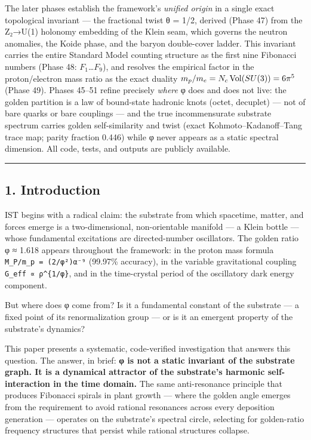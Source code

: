 \documentclass[
]{article}
\begin{document}
The later phases establish the framework's \emph{unified origin} in a
single exact topological invariant --- the fractional twist θ = 1/2,
derived (Phase 47) from the Z₂→U(1) holonomy embedding of the Klein
seam, which governs the neutron anomalies, the Koide phase, and the
baryon double-cover ladder. This invariant carries the entire Standard
Model counting structure as the first nine Fibonacci numbers (Phase 48:
\(F_1\)\ldots{}\(F_9\)), and resolves the empirical factor in the
proton/electron mass ratio as the exact duality
\(m_p/m_e = N_c\,{\rm Vol}(SU(3)) = 6\pi^5\) (Phase 49). Phases 45--51
refine precisely \emph{where} φ does and does not live: the golden
partition is a law of bound-state hadronic knots (octet, decuplet) ---
not of bare quarks or bare couplings --- and the true incommensurate
substrate spectrum carries golden self-similarity and twist (exact
Kohmoto--Kadanoff--Tang trace map; parity fraction 0.446) while φ never
appears as a static spectral dimension. All code, tests, and outputs are
publicly available.

\begin{center}\rule{0.5\linewidth}{0.5pt}\end{center}

\subsection{1. Introduction}\label{introduction}

IST begins with a radical claim: the substrate from which spacetime,
matter, and forces emerge is a two-dimensional, non-orientable manifold
--- a Klein bottle --- whose fundamental excitations are directed-number
oscillators. The golden ratio φ ≈ 1.618 appears throughout the
framework: in the proton mass formula \texttt{M\_P/m\_p\ =\ (2/φ²)α⁻⁹}
(99.97\% accuracy), in the variable gravitational coupling
\texttt{G\_eff\ ∝\ ρ\^{}\{1/φ\}}, and in the time-crystal period of the
oscillatory dark energy component.

But where does φ come from? Is it a fundamental constant of the
substrate --- a fixed point of its renormalization group --- or is it an
emergent property of the substrate's dynamics?

This paper presents a systematic, code-verified investigation that
answers this question. The answer, in brief: \textbf{φ is not a static
invariant of the substrate graph. It is a dynamical attractor of the
substrate's harmonic self-interaction in the time domain.} The same
anti-resonance principle that produces Fibonacci spirals in plant growth
--- where the golden angle emerges from the requirement to avoid
rational resonances across every deposition generation --- operates on
the substrate's spectral circle, selecting for golden-ratio frequency
structures that persist while rational structures collapse.
\end{document}
